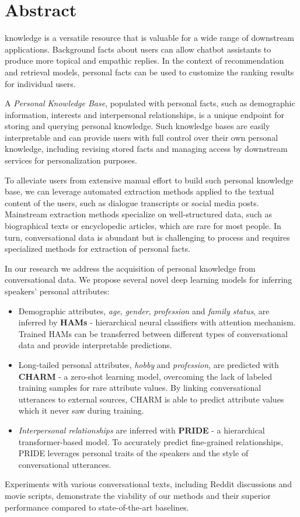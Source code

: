 \section*{Abstract}
\label{abstract}


 knowledge is a versatile resource that is valuable for a wide range of downstream applications.
Background facts about users can allow chatbot assistants to produce more topical and empathic replies.
In the context of recommendation and retrieval models, personal facts can be used to customize the ranking results for individual users.

A \textit{Personal Knowledge Base}, populated with personal facts, such as demographic information, interests and interpersonal relationships, is a unique endpoint for storing and querying personal knowledge. 
Such knowledge bases are easily interpretable and can provide users with full control over their own personal knowledge, including revising stored facts and managing access by downstream services for personalization purposes.

To alleviate users from extensive manual effort to build such personal knowledge base, we can leverage automated extraction methods applied to the textual content of the users, such as dialogue transcripts or social media posts. Mainstream extraction methods specialize on well-structured data, such as biographical texts or encyclopedic articles, which are rare for most people.
In turn, conversational data is abundant but is challenging to process and requires specialized methods for extraction of personal facts.

In our research we address the acquisition of personal knowledge from conversational data. We propose several novel deep learning models for inferring speakers' personal attributes:
\begin{itemize}
    \item Demographic attributes, \textit{age}, \textit{gender}, \textit{profession} and \textit{family status}, are inferred by \textbf{HAMs} - hierarchical neural classifiers with attention mechanism. Trained HAMs can be transferred between different types of conversational data and provide interpretable predictions.
    
    \item Long-tailed personal attributes, \textit{hobby} and \textit{profession}, are predicted with \textbf{CHARM} - a zero-shot learning model, overcoming the lack of labeled training samples for rare attribute values. By linking conversational utterances to external sources, CHARM is able to predict attribute values which it never saw during training.
    
    \item \textit{Interpersonal relationships} are inferred with \textbf{PRIDE} - a hierarchical transformer-based model. To accurately predict fine-grained relationships, PRIDE leverages personal traits of the speakers and the style of conversational utterances.
\end{itemize}

Experiments with various conversational texts, including Reddit discussions and movie scripts, demonstrate the viability of our methods and their superior performance compared to state-of-the-art baselines.